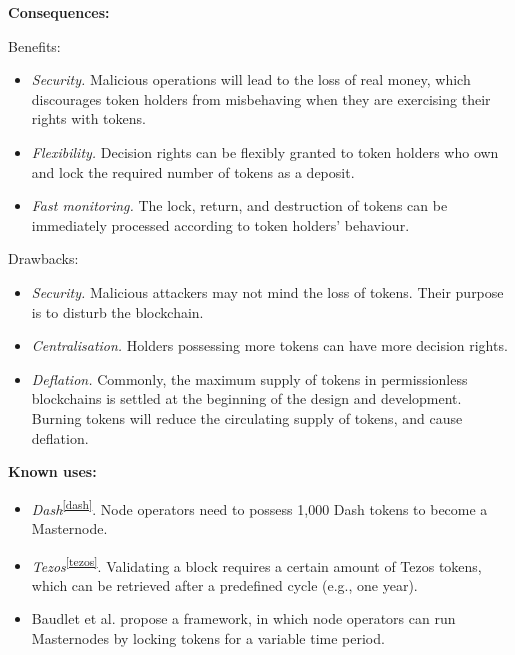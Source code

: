 \documentclass{article}
\begin{document}
\vspace{0.5em}\noindent \textbf{Consequences:} 

Benefits:
\begin{itemize}
  \item \textit{Security.} Malicious operations will lead to the loss of real money, which discourages token holders from misbehaving when they are exercising their rights with tokens.
  
  \item \textit{Flexibility.} Decision rights can be flexibly granted to token holders who own and lock the required number of tokens as a deposit.
  
  \item \textit{Fast monitoring.} The lock, return, and destruction of tokens can be immediately processed according to token holders' behaviour.
\end{itemize}

Drawbacks:
\begin{itemize}
  \item \textit{Security.} Malicious attackers may not mind the loss of tokens. Their purpose is to disturb the blockchain.

  \item \textit{Centralisation.} Holders possessing more tokens can have more decision rights. 

  \item \textit{Deflation.} Commonly, the maximum supply of tokens in permissionless blockchains is settled at the beginning of the design and development. Burning tokens will reduce the circulating supply of tokens, and cause deflation.
\end{itemize}


\vspace{0.5em}\noindent \textbf{Known uses:}  
 \begin{itemize}
   \item \textit{Dash}\textsuperscript{\ref{dash}}. Node operators need to possess 1,000 Dash tokens to become a Masternode.
   
   \item \textit{Tezos}\textsuperscript{\ref{tezos}}. Validating a block requires a certain amount of Tezos tokens, which can be retrieved after a predefined cycle (e.g., one year).
   
   \item Baudlet et al. \cite{selected2} propose a framework, in which node operators can run Masternodes by locking tokens for a variable time period.
 \end{itemize}
\end{document}
